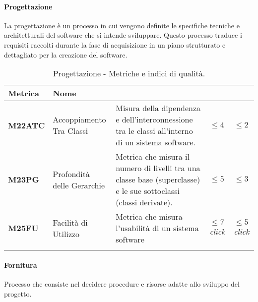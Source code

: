 \paragraph{Progettazione}
La progettazione è un processo in cui vengono definite le specifiche tecniche e architetturali del software che si intende sviluppare. Questo processo traduce i requisiti raccolti durante la fase di acquisizione in un piano strutturato e dettagliato per la creazione del software.

\hspace{1pt}
    \begin{longtable}{|C{1.5cm}|L{3cm}|L{4cm}|L{2.5cm}|L{2.5cm}|}
        \hline
        \textbf{Metrica} & \textbf{Nome} & \textbf{} & \textbf{} & \textbf{} \\
        \hline
        \textbf{M22ATC} & Accoppiamento Tra Classi &   Misura della dipendenza e dell'interconnessione tra le classi all'interno di un sistema software.   & $\leq 4$  & $\leq 2$ \\
        \hline
        \textbf{M23PG} & Profondità delle Gerarchie & Metrica che misura il numero di livelli tra una classe base (superclasse) e le sue sottoclassi (classi derivate). & $\leq 5$  & $\leq 3$ \\
        \hline
        \textbf{M25FU} & Facilità di Utilizzo & Metrica che misura l'usabilità di un sistema software & $\leq 7$ \textit{click}  & $\leq 5$ \textit{click} \\
        \hline
    \caption{Progettazione - Metriche e indici di qualità.}
    \label{tab:progettazione_progetto}
\end{longtable}

\paragraph{Fornitura}
Processo che consiste nel decidere procedure e risorse
adatte allo sviluppo del progetto.

